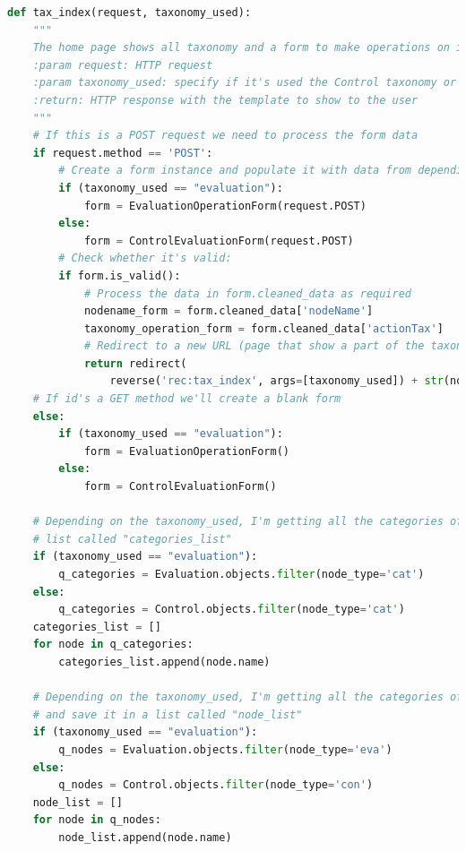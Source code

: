 \begin{lstlisting}[language=Python, caption={Parti principali del codice delle View della soluzione per gestire la navigazione 
    delle tassonomie, quella delle Evaluation e quella dei Controlli}]
def tax_index(request, taxonomy_used):
    """
    The home page shows all taxonomy and a form to make operations on it.
    :param request: HTTP request
    :param taxonomy_used: specify if it's used the Control taxonomy or the Evaluation taxonomy
    :return: HTTP response with the template to show to the user
    """
    # If this is a POST request we need to process the form data
    if request.method == 'POST':
        # Create a form instance and populate it with data from depending on the taxonomy_used
        if (taxonomy_used == "evaluation"):
            form = EvaluationOperationForm(request.POST)
        else:
            form = ControlEvaluationForm(request.POST)
        # Check whether it's valid:
        if form.is_valid():
            # Process the data in form.cleaned_data as required
            nodename_form = form.cleaned_data['nodeName']
            taxonomy_operation_form = form.cleaned_data['actionTax']
            # Redirect to a new URL (page that show a part of the taxonomy, depending on the action user has chosen):
            return redirect(
                reverse('rec:tax_index', args=[taxonomy_used]) + str(nodename_form) + '_' + taxonomy_operation_form)
    # If id's a GET method we'll create a blank form
    else:
        if (taxonomy_used == "evaluation"):
            form = EvaluationOperationForm()
        else:
            form = ControlEvaluationForm()

    # Depending on the taxonomy_used, I'm getting all the categories of Evaluations or Controls taxonomy and save it in a
    # list called "categories_list"
    if (taxonomy_used == "evaluation"):
        q_categories = Evaluation.objects.filter(node_type='cat')
    else:
        q_categories = Control.objects.filter(node_type='cat')
    categories_list = []
    for node in q_categories:
        categories_list.append(node.name)

    # Depending on the taxonomy_used, I'm getting all the categories of Evaluations or Controls node in the taxonomy
    # and save it in a list called "node_list"
    if (taxonomy_used == "evaluation"):
        q_nodes = Evaluation.objects.filter(node_type='eva')
    else:
        q_nodes = Control.objects.filter(node_type='con')
    node_list = []
    for node in q_nodes:
        node_list.append(node.name)


\end{lstlisting}
